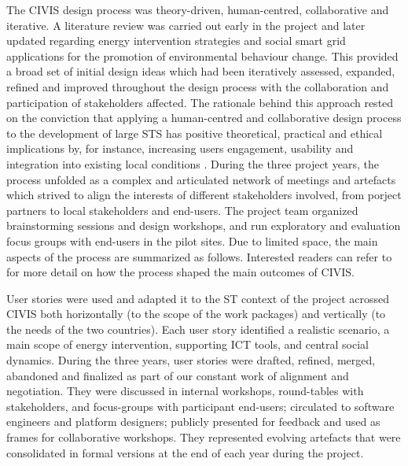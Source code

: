 The CIVIS design process was theory-driven, human-centred, collaborative and iterative. A
literature review was carried out early in the project and later updated regarding energy intervention strategies and social smart
grid applications for the promotion of environmental behaviour change. This provided a broad set
of initial design ideas which had been iteratively assessed, expanded, refined and improved throughout the design process with the collaboration and participation of stakeholders affected.
% 
The rationale behind this approach rested on the conviction that applying a human-centred and
collaborative design process to the development of large STS has positive
theoretical, practical and ethical implications \cite{Boedker2004,Greenbaum1993} by, for instance, increasing users engagement,
usability and integration into existing local conditions \cite{Brynjarsdottir2012,Dick2012,Pierce2012}.
% 
During the three project years, the process unfolded as a complex and articulated network of meetings and artefacts
which strived to align the interests of different stakeholders involved, from porject partners to
local stakeholders and end-users. The project team organized brainstorming sessions and design workshops, and run exploratory and evaluation focus groups with end-users in the pilot sites.
Due to limited space, the main aspects of the process are summarized as follows. Interested readers can refer to
\cite{poderi_disentangling_2017} for more detail  on how the process shaped the main
outcomes of CIVIS. %


User stories \cite{Kankainen2012} were used and adapted it to the ST context of the project acrossed CIVIS both horizontally (to the
scope of the work packages) and vertically (to the needs of the two countries). Each user
story identified a realistic scenario, a main scope of energy intervention, supporting ICT tools,
and central social dynamics. During the three years, user stories were drafted, refined, merged, abandoned and
finalized as part of our constant work of alignment and negotiation. They were discussed in internal
workshops, round-tables with stakeholders, and focus-groups with participant end-users; circulated
 to software engineers and platform designers; publicly presented for feedback and used 
as frames for collaborative workshops. They represented evolving artefacts that were consolidated in formal
versions at the end of each year during the project. 

